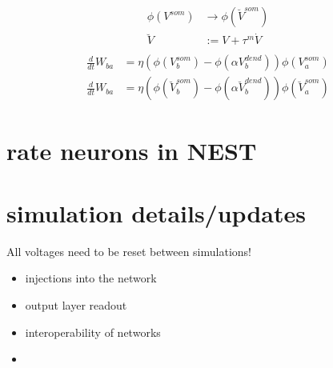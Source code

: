 \begin{align}
  \phi(V^{som}) & \rightarrow \phi(\breve{V}^{som}) \\
  \breve{V}     & := V + \tau^m \dot{V}             \\
\end{align}
\begin{align}
  \frac{d}{dt} W_{ba} & = \eta (\phi(V_b^{som}) - \phi(\alpha V_b^{dend})) \phi(V_a^{som})                         \\
  \frac{d}{dt} W_{ba} & = \eta (\phi(\breve{V}_b^{som}) - \phi(\alpha \breve{V}_b^{dend})) \phi(\breve{V}_a^{som})
\end{align}


\section{rate neurons in NEST}

\section{simulation details/updates}

All voltages need to be reset between simulations!

\begin{itemize}
  \item injections into the network
  \item output layer readout
  \item interoperability of networks
  \item

\end{itemize}

